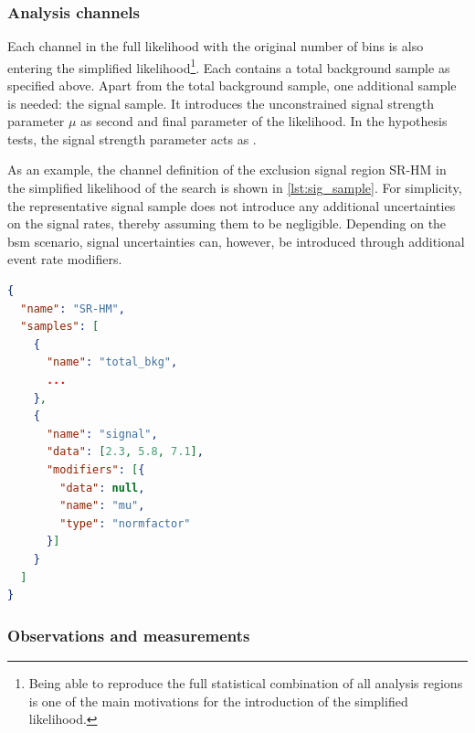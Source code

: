 \subsubsection{Analysis channels}

Each channel in the full likelihood with the original number of bins is also entering the simplified likelihood\footnote{Being able to reproduce the full statistical combination of all analysis regions is one of the main motivations for the introduction of the simplified likelihood.}.
Each contains a total background sample as specified above.
Apart from the total background sample, one additional sample is needed: the signal sample.
It introduces the unconstrained signal strength parameter $\mu$ as second and final parameter of the likelihood. In the hypothesis tests, the signal strength parameter acts as .

As an example, the channel definition of the exclusion signal region SR-HM in the simplified likelihood of the \onelepton search is shown in \cref{lst:sig_sample}. For simplicity, the representative signal sample does not introduce any additional uncertainties on the signal rates, thereby assuming them to be negligible. Depending on the \gls{bsm} scenario, signal uncertainties can, however, be introduced through additional event rate modifiers.

\begin{minipage}{\linewidth}
\begin{lstlisting}[language=json,firstnumber=1,caption={Channel definition of the exclusion signal region SR-HM of the \onelepton search. The representative signal sample with sample rate and unconstrained normalisation parameter does not introduce any additional uncertainties. The three dots `\dots' contain the remaining definition for the total background sample from \cref{lst:bkg_sample}.},captionpos=b, label=lst:sig_sample]
{
  "name": "SR-HM",
  "samples": [
    {
      "name": "total_bkg",
      ...
    },
    {
      "name": "signal",
      "data": [2.3, 5.8, 7.1],
      "modifiers": [{
        "data": null, 
        "name": "mu", 
        "type": "normfactor"
      }]
    }
  ]
}
\end{lstlisting}
\end{minipage}

\subsubsection{Observations and measurements}

